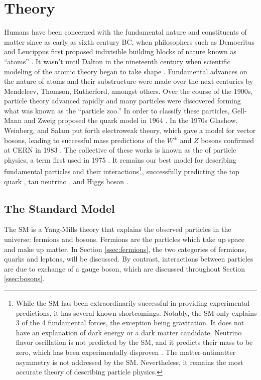 \chapter{Theory}

    Humans have been concerned with the fundamental nature and constituents of matter since as early as sixth century BC, when philosophers such as Democritus and Leucippus first proposed indivisible building blocks of nature known as ``atoms'' \cite{democritus}. It wasn't until Dalton in the nineteenth century when scientific modeling of the atomic theory began to take shape \cite{dalton}. Fundamental advances on the nature of atoms and their substructure were made over the next centuries by Mendeleev, Thomson, Rutherford, amongst others. Over the course of the 1900s, particle theory advanced rapidly and many particles were discovered forming what was known as the ``particle zoo.'' In order to classify these particles, Gell-Mann and Zweig proposed the quark model in 1964 \cite{quark-model}. In the 1970s Glashow, Weinberg, and Salam put forth electroweak theory, which gave a model for vector bosons, leading to successful mass predictions of the $W^{\pm}$ and $Z$ bosons confirmed at \gls{CERN} in 1983 \cite{w-discovery, z-discovery}. The collective of these works is known as the  of particle physics, a term first used in 1975 \cite{conceptual-developments-text}. It remains our best model for describing fundamental particles and their interactions\footnote{While the \gls{SM} has been extraordinarily successful in providing experimental predictions, it has several known shortcomings. Notably, the \gls{SM} only explains 3 of the 4 fundamental forces, the exception being gravitation. It does not have an explanation of dark energy or a dark matter candidate. Neutrino flavor oscillation is not predicted by the \gls{SM}, and it predicts their mass to be zero, which has been experimentally disproven \cite{neutrino-oscillation}. The matter-antimatter asymmetry is not addressed by the \gls{SM}. Nevertheless, it remains the most accurate theory of describing particle physics.}, successfully predicting the top quark \cite{top-quark}, tau neutrino \cite{tau-neutrino}, and Higgs boson \cite{higgs-discovery-atlas,higgs-discovery-cms}.
    

    \section{The Standard Model}

        The \gls{SM} is a Yang-Mills theory that explains the observed particles in the universe: fermions and bosons. Fermions are the particles which take up space and make up matter. In Section \ref{ssec:fermions}, the two categories of fermions, quarks and leptons, will be discussed. By contrast, interactions between particles are due to exchange of a gauge boson, which are discussed throughout Section \ref{ssec:bosons}.


